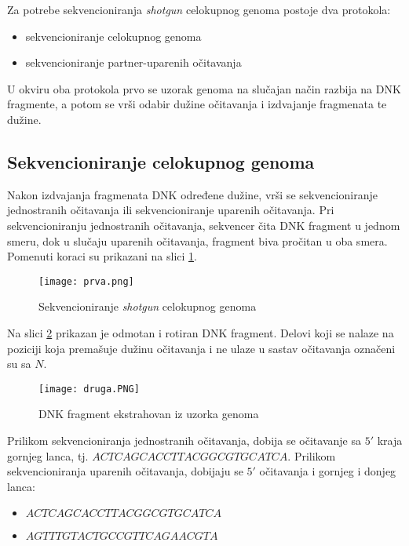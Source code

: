 \documentclass[12pt,oneside]{memoir}
\begin{document}
Za potrebe sekvencioniranja \textit{shotgun} celokupnog genoma postoje dva protokola:
\begin{itemize}
\itemsep0em 
    \item {sekvencioniranje celokupnog genoma}
    \item {sekvencioniranje partner-uparenih očitavanja}
\end{itemize}

\noindent U okviru oba protokola prvo se uzorak genoma na slučajan način razbija na DNK fragmente, a potom se vrši odabir dužine očitavanja i izdvajanje fragmenata te dužine.

\subsection{Sekvencioniranje celokupnog genoma}

Nakon izdvajanja fragmenata DNK određene dužine, vrši se sekvencioniranje jednostranih očitavanja ili sekvencioniranje uparenih očitavanja. Pri sekvencioniranju jednostranih očitavanja, sekvencer čita DNK fragment u jednom smeru, dok u slučaju uparenih očitavanja, fragment biva pročitan u oba smera. Pomenuti koraci su prikazani na slici \ref{fig:1}.

\begin{figure}[!ht]
  \centering
  \texttt{[image: prva.png]}
  \caption{Sekvencioniranje \textit{shotgun} celokupnog genoma \cite{WingKinSung}}
\label{fig:1}
\end{figure}

Na slici \ref{fig:2} prikazan je odmotan i rotiran DNK fragment. Delovi koji se nalaze na poziciji koja premašuje dužinu očitavanja i ne ulaze u sastav očitavanja označeni su sa $N$. 

\begin{figure}[!ht]
  \centering
  \texttt{[image: druga.PNG]}
  \caption{DNK fragment ekstrahovan iz uzorka genoma \cite{WingKinSung}}
  \label{fig:2}
\end{figure}

 Prilikom sekvencioniranja jednostranih očitavanja, dobija se očitavanje sa $5'$ kraja gornjeg lanca, tj. $ACTCAGCACCTTACGGCGTGCATCA$. Prilikom sekvencioniranja uparenih očitavanja, dobijaju se $5'$ očitavanja i gornjeg i donjeg lanca:

\begin{itemize}
\itemsep0em 
    \item {$ACTCAGCACCTTACGGCGTGCATCA$}
    \item {$AGTTTGTACTGCCGTTCAGAACGTA$}
\end{itemize}
\end{document}
